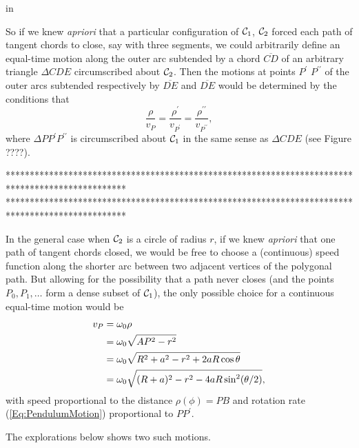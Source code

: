 \documentclass{ximera}
\newcommand{\pskip}{\vskip 0.1 in}
\begin{document}
\pskip




So if we knew \emph{apriori} that a particular configuration of ${\cal C}_1$, ${\cal C}_2$ forced each path of tangent chords to close, say with three segments, we could arbitrarily define an equal-time motion along the outer arc subtended by a chord $\overline{CD}$ of an arbitrary triangle $\Delta CDE$ circumscribed about ${\cal C}_2$. Then the motions at points $P^\prime$ $P^{\prime\prime}$ of the outer arcs subtended respectively by $\overline{DE}$ and $\overline{DE}$ would be determined by the conditions that
\[
       \frac{\rho}{v_P} = \frac{\rho^\prime}{v_{P^\prime}} = \frac{\rho^{\prime\prime}}{v_{P^{\prime\prime}}},
\]
where $\Delta PP^\prime P^{\prime\prime}$ is circumscribed about ${\cal C}_1$ in the same sense as $\Delta CDE$ (see Figure ????).

*************************************************************************************************
*************************************************************************************************
\fi

In the general case when ${\cal C}_2$ is a circle of radius $r$, if we knew \emph{apriori} that one path of tangent chords closed, we would be free to choose a (continuous) speed function along the shorter arc between two adjacent vertices of the polygonal path. But allowing for the possibility that a path never closes (and the points $P_0, P_1, \ldots$ form a dense subset of ${\cal C}_1$), the only possible choice for a continuous equal-time motion would be
\begin{align}
    v_P  &= \omega_0 \rho   \notag  \\ 
          &= \omega_0 \sqrt{AP^2 - r^2}  \notag \\
          &= \omega_0 \sqrt{R^2 + a^2 - r^2 + 2aR \cos\theta} \notag \\
          &= \omega_0  \sqrt{(R+a)^2 - r^2 - 4aR\sin^2 (\theta/2)}, \label{Eq:EqualTime8}
\end{align}
with speed proportional to the distance $\rho(\phi) = PB$ and rotation rate (\ref{Eq:PendulumMotion}) proportional to $PP^\prime$.

\begin{onlineOnly}
    \begin{center}
\end{center}
\end{onlineOnly}



The explorations below shows two such motions.
\end{document}
